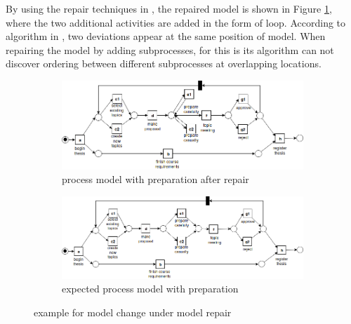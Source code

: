By using the repair techniques in \cite{fahland2015model}, the repaired model is shown in Figure \ref{fig:model_b1}, where the two additional activities are added in the form of loop. According to algorithm in \cite{fahland2015model}, two deviations appear at the same position of model. When repairing the model by adding subprocesses,  
 for this is its algorithm can not discover ordering between different subprocesses at overlapping locations.  %
\begin{figure}[htp]
	\centering
	\begin{subfigure}[b]{\textwidth}
		\centering
		\includegraphics[width=\linewidth]{figures/introduction/Thesis-PN-Example-loop-preparation.png}
		\caption{process model with preparation after repair }
		\label{fig:model_b1}
	\end{subfigure}
	\hfill
	\begin{subfigure}[b]{\textwidth}
		\centering
		\includegraphics[width=01.0\linewidth]{figures/introduction/Thesis-PN-Example-with-preparation.png}
		\caption{expected process model with preparation}
		\label{fig:model_b2}
	\end{subfigure}
	\caption{example for model change under model repair}
	\label{fig:model_with_preparation}
\end{figure}



